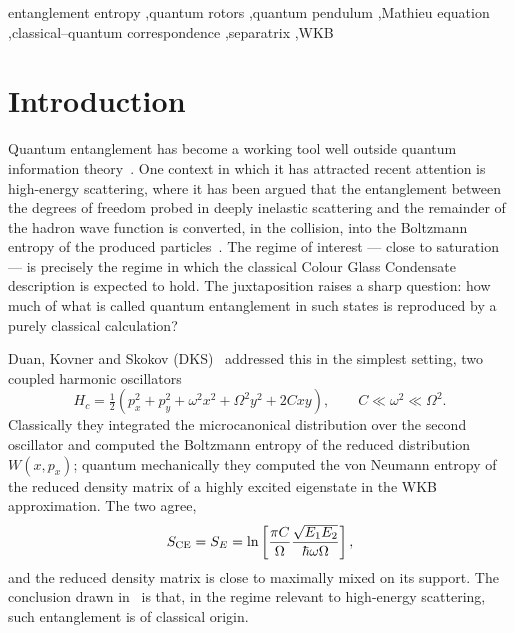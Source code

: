 \documentclass[preprint,12pt]{elsarticle}
\begin{document}
\begin{frontmatter}
\begin{keyword}
entanglement entropy \sep quantum rotors \sep quantum pendulum \sep Mathieu
equation \sep classical--quantum correspondence \sep separatrix \sep WKB
\end{keyword}

\end{frontmatter}

\tableofcontents
\newpage

\section{Introduction}
\label{sec:intro}

Quantum entanglement has become a working tool well outside quantum information
theory~\cite{AmicoRMP,HorodeckiRMP,EisertRMP}. One context in which it has
attracted recent attention is high-energy scattering, where it has been argued
that the entanglement between the degrees of freedom probed in deeply inelastic
scattering and the remainder of the hadron wave function is converted, in the
collision, into the Boltzmann entropy of the produced
particles~\cite{KharzeevLevin,Kutak,Hagiwara}. The regime of interest --- close
to saturation --- is precisely the regime in which the classical Colour Glass
Condensate description is expected to hold. The juxtaposition raises a sharp
question: how much of what is called quantum entanglement in such states is
reproduced by a purely classical calculation?

Duan, Kovner and Skokov (DKS)~\cite{DKS} addressed this in the simplest setting,
two coupled harmonic oscillators
\begin{equation}
H_{c}=\tfrac12\left(p_{x}^{2}+p_{y}^{2}+\omega^{2}x^{2}+\Omega^{2}y^{2}
+2Cxy\right),\qquad C\ll\omega^{2}\ll\Omega^{2}.
\label{eq:DKS}
\end{equation}
Classically they integrated the microcanonical distribution over the second
oscillator and computed the Boltzmann entropy of the reduced distribution
$W(x,p_{x})$; quantum mechanically they computed the von Neumann entropy of the
reduced density matrix of a highly excited eigenstate in the WKB
approximation. The two agree,
\begin{equation}
S_{\rm CE}=S_{E}=\ln\left[\frac{\pi C}{\Omega}
\frac{\sqrt{E_{1}E_{2}}}{\hbar\omega\Omega}\right],
\label{eq:DKSresult}
\end{equation}
and the reduced density matrix is close to maximally mixed on its support. The
conclusion drawn in~\cite{DKS} is that, in the regime relevant to high-energy
scattering, such entanglement is of classical origin.
\end{document}
